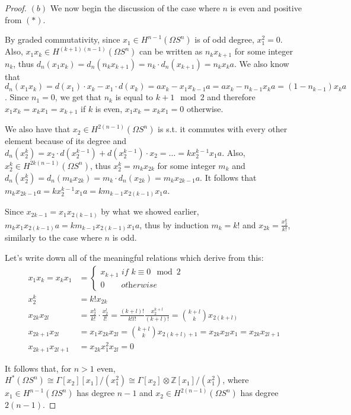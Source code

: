 \documentclass{article}
\newcommand{\numberset}{\mathbb}
\newcommand{\Z}{\numberset{Z}}
\begin{document}
\begin{proof}
    $(b)$ We now begin the discussion of the case where $n$ is even and
    positive from $(*)$.

    By graded commutativity, since $x_1\in H^{n-1}(\Omega S^n)$ is of odd
    degree, $x_1^2=0$. Also, $x_1x_k\in H^{(k+1)(n-1)}(\Omega S^n)$ can be
    written as $n_kx_{k+1}$ for some integer $n_k$, thus
    $d_n(x_1x_k)=d_n(n_kx_{k+1})=n_k\cdot d_n(x_{k+1})=n_kx_ka$. We also
    know that $d_n(x_1x_k)=d(x_1)\cdot x_k-x_1\cdot
    d(x_k)=ax_k-x_1x_{k-1}a=ax_k-n_{k-1}x_k a=(1-n_{k-1})x_ka$. Since
    $n_1=0$, we get that $n_k$ is equal to $k+1\mod 2$ and therefore
    $x_1x_k=x_kx_1=x_{k+1}$ if $k$ is even, $x_1x_k=x_kx_1=0$ otherwise.

    We also have that $x_2\in H^{2(n-1)}(\Omega S^n)$ is s.t. it commutes with
    every other element because of its degree and $d_n(x_2^k)=x_2\cdot
    d(x_2^{k-1})+d(x_2^{k-1})\cdot x_2=\ldots=kx_2^{k-1}x_1a$. Also, $x_2^k\in
    H^{2k(n-1)}(\Omega S^n)$, thus $x_2^k=m_kx_{2k}$ for some integer $m_k$ and
    $d_n(x_2^k)=d_n(m_kx_{2k})=m_k\cdot d_n(x_{2k})=m_kx_{2k-1}a$. It follows
    that $m_kx_{2k-1}a=kx_2^{k-1}x_1a=km_{k-1}x_{2(k-1)}x_1a$.

    Since $x_{2k-1}=x_1x_{2(k-1)}$ by what we showed earlier,
    $m_kx_1x_{2(k-1)}a=km_{k-1}x_{2(k-1)}x_1a$, thus by induction $m_k=k!$ and
    $x_{2k}=\frac{x_2^k}{k!}$, similarly to the case where $n$ is odd.

    Let's write down all of the meaningful relations which derive from this:
    \begin{align*}
        x_1x_k=x_kx_1 &=\begin{cases}
            x_{k+1}\textit{ if }k\equiv 0\mod 2 \\
            0\quad\quad\textit{otherwise}
        \end{cases} \\
        x_2^k &=k!x_{2k} \\
        x_{2k}x_{2l} &=\frac{x_2^k}{k!}\cdot\frac{x_2^l}{l!}=\frac{(k+l)!}{k!l!}
        \frac{x_2^{k+l}}{(k+l)!}=\binom{k+l}{k}x_{2(k+l)} \\
        x_{2k+1}x_{2l} &=x_1x_{2k}x_{2l}=\binom{k+l}{k}x_{2(k+l)+1}=
        x_{2k}x_{2l}x_1=x_{2k}x_{2l+1} \\
        x_{2k+1}x_{2l+1} &=x_{2k}x_1^2x_{2l}=0
    \end{align*}
    
    It follows that, for $n>1$ even, $H^*(\Omega S^n)\cong
    \Gamma[x_2][x_1]/(x_1^2)\cong\Gamma[x_2]\otimes\Z[x_1]/(x_1^2)$, where
    $x_1\in H^{n-1}(\Omega S^n)$ has degree $n-1$ and
    $x_2\in H^{2(n-1)}(\Omega S^n)$ has degree $2(n-1)$.
\end{proof}

\printbibliography
\end{document}
